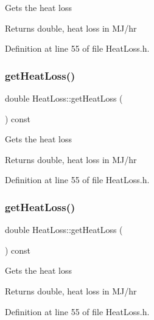 Gets the heat loss \begin{DoxyReturn}{Returns}
double, heat loss in M\+J/hr 
\end{DoxyReturn}


Definition at line 55 of file Heat\+Loss.\+h.

\mbox{\label{class_heat_loss_acc39533782f4f5cbf902d36f7bfc53b0}} 
\subsubsection{\texorpdfstring{get\+Heat\+Loss()}{getHeatLoss()}\hspace{0.1cm}{\footnotesize\ttfamily [2/3]}}
{\footnotesize\ttfamily double Heat\+Loss\+::get\+Heat\+Loss (\begin{DoxyParamCaption}{ }\end{DoxyParamCaption}) const\hspace{0.3cm}{\ttfamily [inline]}}

Gets the heat loss \begin{DoxyReturn}{Returns}
double, heat loss in M\+J/hr 
\end{DoxyReturn}


Definition at line 55 of file Heat\+Loss.\+h.

\mbox{\label{class_heat_loss_acc39533782f4f5cbf902d36f7bfc53b0}} 
\subsubsection{\texorpdfstring{get\+Heat\+Loss()}{getHeatLoss()}\hspace{0.1cm}{\footnotesize\ttfamily [3/3]}}
{\footnotesize\ttfamily double Heat\+Loss\+::get\+Heat\+Loss (\begin{DoxyParamCaption}{ }\end{DoxyParamCaption}) const\hspace{0.3cm}{\ttfamily [inline]}}

Gets the heat loss \begin{DoxyReturn}{Returns}
double, heat loss in M\+J/hr 
\end{DoxyReturn}


Definition at line 55 of file Heat\+Loss.\+h.

